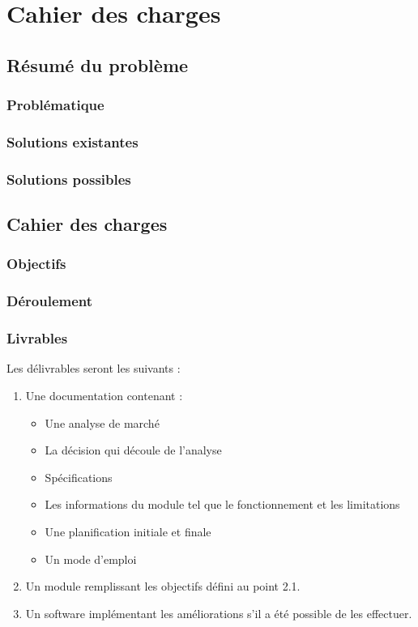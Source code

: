 \chapter{Cahier des charges}



\section*{Résumé du problème}
\lipsum[110-111]

\subsection*{Problématique}
\lipsum[110-110]

\subsection*{Solutions existantes}
\lipsum[1-1]

\subsection*{Solutions possibles}
\lipsum[1-1]



\section*{Cahier des charges}
\lipsum[1-1]


\subsection*{Objectifs}
\lipsum[1-1]

\subsection*{Déroulement}

\subsection*{Livrables}
Les délivrables seront les suivants :
\begin{enumerate}
\item Une documentation contenant :
	\begin{itemize}
	\item Une analyse de marché
	\item La décision qui découle de l’analyse
	\item Spécifications
	\item Les informations du module tel que le fonctionnement et les limitations 
	\item Une planification initiale et finale
	\item Un mode d’emploi
	\end{itemize}
\item Un module remplissant les objectifs défini au point 2.1.
\item Un software implémentant les améliorations s’il a été possible de les effectuer.
\end{enumerate}

